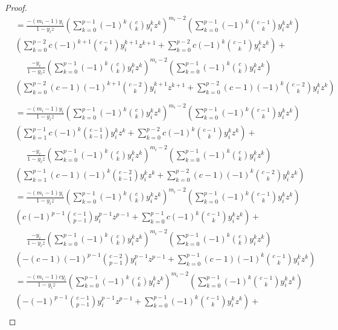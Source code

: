\documentclass{amsart}
\theoremstyle{definition}
\begin{document}
\begin{proof}
\begin{align*}
&=\frac{-(m_i-1)y_i}{1-y_iz}\left(\sum_{k = 0}^{p - 1} (-1)^k\binom{c}{k} y_i^k z^k\right)^{m_i - 2}\left(\sum_{k = 0}^{p - 1} (-1)^k\binom{c - 1}{k} y_i^k z^k\right)\\&\left(\sum_{k = 0}^{p - 2} c(-1)^{k+1}\binom{c-1}{k} y_i^{k+1} z^{k+1}+\sum_{k = 0}^{p - 2} c(-1)^{k}\binom{c-1}{k} y_i^{k} z^{k}\right)+\\
&\;\;\;\;\;\frac{-y_i}{1-y_iz}\left(\sum_{k = 0}^{p - 1} (-1)^k\binom{c}{k} y_i^k z^k\right)^{m_i - 2}\left(\sum_{k = 0}^{p - 1} (-1)^k\binom{c}{k} y_i^k z^k\right)\\&\left(\sum_{k = 0}^{p - 2}(c-1) (-1)^{k+1}\binom{c - 2}{k} y_i^{k+1} z^{k+1}+\sum_{k = 0}^{p - 2}(c-1) (-1)^{k}\binom{c - 2}{k} y_i^{k} z^{k}\right)\\
\end{align*}
\begin{align*}
&=\frac{-(m_i-1)y_i}{1-y_iz}\left(\sum_{k = 0}^{p - 1} (-1)^k\binom{c}{k} y_i^k z^k\right)^{m_i - 2}\left(\sum_{k = 0}^{p - 1} (-1)^k\binom{c - 1}{k} y_i^k z^k\right)\\&\left(\sum_{k = 1}^{p - 1} c(-1)^{k}\binom{c-1}{k-1} y_i^{k} z^{k}+\sum_{k = 0}^{p - 2} c(-1)^{k}\binom{c-1}{k} y_i^{k} z^{k}\right)+\\
&\;\;\;\;\;\frac{-y_i}{1-y_iz}\left(\sum_{k = 0}^{p - 1} (-1)^k\binom{c}{k} y_i^k z^k\right)^{m_i - 2}\left(\sum_{k = 0}^{p - 1} (-1)^k\binom{c}{k} y_i^k z^k\right)\\&\left(\sum_{k = 1}^{p - 1}(c-1) (-1)^{k}\binom{c - 2}{k-1} y_i^{k} z^{k}+\sum_{k = 0}^{p - 2}(c-1) (-1)^{k}\binom{c - 2}{k} y_i^{k} z^{k}\right)\\
&=\frac{-(m_i-1)y_i}{1-y_iz}\left(\sum_{k = 0}^{p - 1} (-1)^k\binom{c}{k} y_i^k z^k\right)^{m_i - 2}\left(\sum_{k = 0}^{p - 1} (-1)^k\binom{c - 1}{k} y_i^k z^k\right)\\&\left(c(-1)^{p-1}\binom{c-1}{p-1}y_i^{p-1}z^{p-1}+\sum_{k = 0}^{p - 1} c(-1)^{k}\binom{c-1}{k} y_i^{k} z^{k}\right)+\\
&\;\;\;\;\;\frac{-y_i}{1-y_iz}\left(\sum_{k = 0}^{p - 1} (-1)^k\binom{c}{k} y_i^k z^k\right)^{m_i - 2}\left(\sum_{k = 0}^{p - 1} (-1)^k\binom{c}{k} y_i^k z^k\right)\\&\left(-(c-1)(-1)^{p-1}\binom{c-2}{p-1}y_i^{p-1}z^{p-1}+\sum_{k = 0}^{p - 1}(c-1) (-1)^{k}\binom{c - 1}{k} y_i^{k} z^{k}\right)\\
&=\frac{-(m_i-1)cy_i}{1-y_iz}\left(\sum_{k = 0}^{p - 1} (-1)^k\binom{c}{k} y_i^k z^k\right)^{m_i - 2}\left(\sum_{k = 0}^{p - 1} (-1)^k\binom{c - 1}{k} y_i^k z^k\right)\\&\left(-(-1)^{p-1}\binom{c-1}{p-1}y_i^{p-1}z^{p-1}+\sum_{k = 0}^{p - 1} (-1)^{k}\binom{c-1}{k} y_i^{k} z^{k}\right)+\\

\end{align*}
\end{proof}
\end{document}

